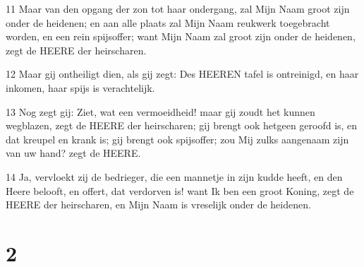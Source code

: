 \par 11 Maar van den opgang der zon tot haar ondergang, zal Mijn Naam groot zijn onder de heidenen; en aan alle plaats zal Mijn Naam reukwerk toegebracht worden, en een rein spijsoffer; want Mijn Naam zal groot zijn onder de heidenen, zegt de HEERE der heirscharen.
\par 12 Maar gij ontheiligt dien, als gij zegt: Des HEEREN tafel is ontreinigd, en haar inkomen, haar spijs is verachtelijk.
\par 13 Nog zegt gij: Ziet, wat een vermoeidheid! maar gij zoudt het kunnen wegblazen, zegt de HEERE der heirscharen; gij brengt ook hetgeen geroofd is, en dat kreupel en krank is; gij brengt ook spijsoffer; zou Mij zulks aangenaam zijn van uw hand? zegt de HEERE.
\par 14 Ja, vervloekt zij de bedrieger, die een mannetje in zijn kudde heeft, en den Heere belooft, en offert, dat verdorven is! want Ik ben een groot Koning, zegt de HEERE der heirscharen, en Mijn Naam is vreselijk onder de heidenen.

\chapter{2}

